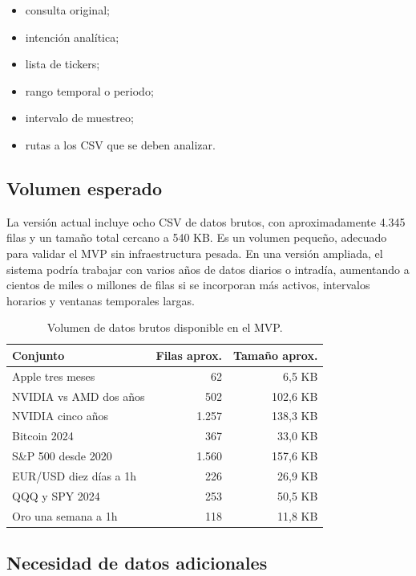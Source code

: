 \documentclass[11pt,a4paper]{article}
\begin{document}
\begin{itemize}
    \item consulta original;
    \item intenci\'on anal\'itica;
    \item lista de tickers;
    \item rango temporal o periodo;
    \item intervalo de muestreo;
    \item rutas a los CSV que se deben analizar.
\end{itemize}

\subsection{Volumen esperado}

La versi\'on actual incluye ocho CSV de datos brutos, con aproximadamente 4.345 filas y un tama\~no total cercano a 540 KB. Es un volumen peque\~no, adecuado para validar el MVP sin infraestructura pesada. En una versi\'on ampliada, el sistema podr\'ia trabajar con varios a\~nos de datos diarios o intrad\'ia, aumentando a cientos de miles o millones de filas si se incorporan m\'as activos, intervalos horarios y ventanas temporales largas.

\begin{table}[h]
\centering
\begin{tabular}{lrr}
\toprule
\textbf{Conjunto} & \textbf{Filas aprox.} & \textbf{Tama\~no aprox.} \\
\midrule
Apple tres meses & 62 & 6,5 KB \\
NVIDIA vs AMD dos a\~nos & 502 & 102,6 KB \\
NVIDIA cinco a\~nos & 1.257 & 138,3 KB \\
Bitcoin 2024 & 367 & 33,0 KB \\
S\&P 500 desde 2020 & 1.560 & 157,6 KB \\
EUR/USD diez d\'ias a 1h & 226 & 26,9 KB \\
QQQ y SPY 2024 & 253 & 50,5 KB \\
Oro una semana a 1h & 118 & 11,8 KB \\
\bottomrule
\end{tabular}
\caption{Volumen de datos brutos disponible en el MVP.}
\end{table}

\subsection{Necesidad de datos adicionales}
\end{document}
